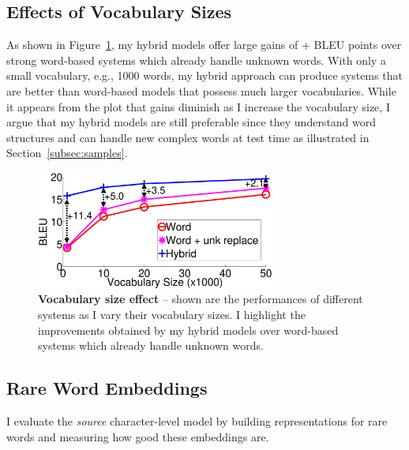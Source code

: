 \subsection{Effects of Vocabulary Sizes}
As shown in Figure~\ref{f:vocab}, my hybrid models offer large gains of
+\gain{} BLEU points over strong word-based systems which already handle unknown words.
With only a small vocabulary, e.g., 1000 words, my hybrid approach can produce
systems that are better than word-based models that possess much larger
vocabularies. While it appears from the plot that gains diminish as I
increase the vocabulary size, I argue that my hybrid models are still
preferable since they understand word structures and can handle new complex
words at test time as illustrated in Section~\ref{subsec:samples}.
\begin{figure}
\centering
\includegraphics[width=0.7\textwidth, clip=true, trim= 0 0 0 0]{img/5-vocab}
\caption[Vocabulary size effect]{{\bf Vocabulary size effect} -- shown are the performances of different
systems as I vary their vocabulary sizes. I highlight the improvements obtained
by my hybrid models over word-based systems which already handle unknown words.}
\label{f:vocab}
\end{figure}



\subsection{Rare Word Embeddings}
I evaluate the {\it source} character-level model by building representations
for rare words and measuring how good these embeddings are.

